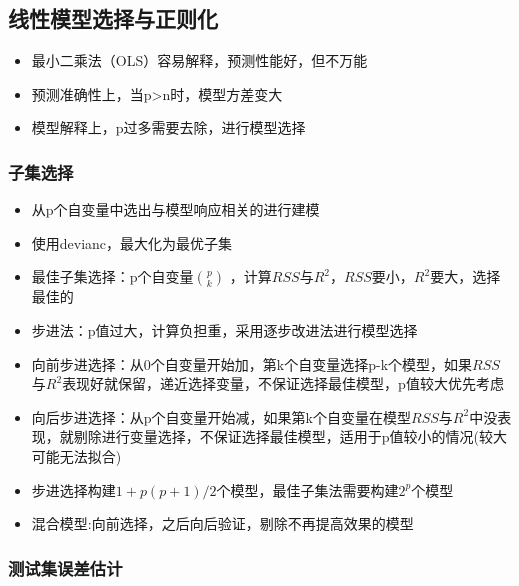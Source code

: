 \documentclass[]{book}
\providecommand{\tightlist}{%
  \setlength{\itemsep}{0pt}\setlength{\parskip}{0pt}}
\begin{document}
\hypertarget{ux7ebfux6027ux6a21ux578bux9009ux62e9ux4e0eux6b63ux5219ux5316}{%
\subsection{线性模型选择与正则化}\label{ux7ebfux6027ux6a21ux578bux9009ux62e9ux4e0eux6b63ux5219ux5316}}

\begin{itemize}
\tightlist
\item
  最小二乘法（OLS）容易解释，预测性能好，但不万能
\item
  预测准确性上，当p\textgreater{}n时，模型方差变大
\item
  模型解释上，p过多需要去除，进行模型选择
\end{itemize}

\hypertarget{ux5b50ux96c6ux9009ux62e9}{%
\subsubsection{子集选择}\label{ux5b50ux96c6ux9009ux62e9}}

\begin{itemize}
\tightlist
\item
  从p个自变量中选出与模型响应相关的进行建模
\item
  使用devianc，最大化为最优子集
\item
  最佳子集选择：p个自变量\(p \choose k\) ，计算\(RSS\)与\(R^2\)，\(RSS\)要小，\(R^2\)要大，选择最佳的
\item
  步进法：p值过大，计算负担重，采用逐步改进法进行模型选择
\item
  向前步进选择：从0个自变量开始加，第k个自变量选择p-k个模型，如果\(RSS\)与\(R^2\)表现好就保留，递近选择变量，不保证选择最佳模型，p值较大优先考虑
\item
  向后步进选择：从p个自变量开始减，如果第k个自变量在模型\(RSS\)与\(R^2\)中没表现，就剔除进行变量选择，不保证选择最佳模型，适用于p值较小的情况(较大可能无法拟合)
\item
  步进选择构建\(1 + p(p+1)/2\)个模型，最佳子集法需要构建\(2^p\)个模型
\item
  混合模型:向前选择，之后向后验证，剔除不再提高效果的模型
\end{itemize}

\hypertarget{ux6d4bux8bd5ux96c6ux8befux5deeux4f30ux8ba1}{%
\subsubsection{测试集误差估计}\label{ux6d4bux8bd5ux96c6ux8befux5deeux4f30ux8ba1}}
\end{document}
